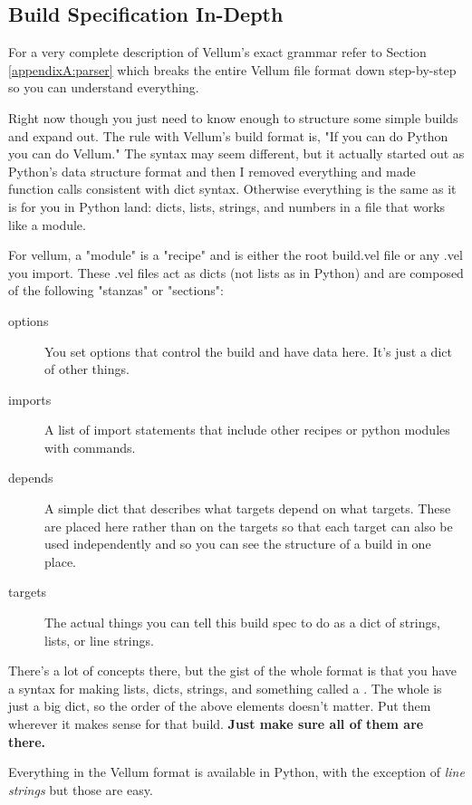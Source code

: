 \subsection{Build Specification In-Depth}

For a very complete description of Vellum's exact grammar refer to Section
\ref{appendixA:parser} which breaks the entire Vellum  file
format down step-by-step so you can understand everything.  

Right now though you just need to know enough to structure some simple builds
and expand out.  The rule with Vellum's build format is, "If you can do Python
you can do Vellum."  The syntax may seem different, but it actually started out
as Python's data structure format and then I removed everything and made
function calls consistent with dict syntax.  Otherwise everything is the same as
it is for you in Python land:  dicts, lists, strings, and numbers in a file that
works like a module.

For vellum, a "module" is a "recipe" and is either the root build.vel file or
any .vel you import.  These .vel files act as dicts (not lists as in Python) and
are composed of the following "stanzas" or "sections":

\begin{description}
\item[options] You set options that control the build and have data here.  It's
just a dict of other things.
\item[imports] A list of import statements that include other recipes or python
modules with commands.
\item[depends] A simple dict that describes what targets depend on what targets.
These are placed here rather than on the targets so that each target can also be
used independently and so you can see the structure of a build in one place.
\item[targets] The actual things you can tell this build spec to do as a dict of
strings, lists, or line strings.
\end{description}

There's a lot of concepts there, but the gist of the whole format is that you
have a syntax for making lists, dicts, strings, and something called a
.  The whole  is just a big dict, so the order of the
above elements doesn't matter.  Put them wherever it makes sense for that build.
{\bf Just make sure all of them are there.}

Everything in the Vellum format is available in Python, with the exception of
\emph{line strings} but those are easy. 

